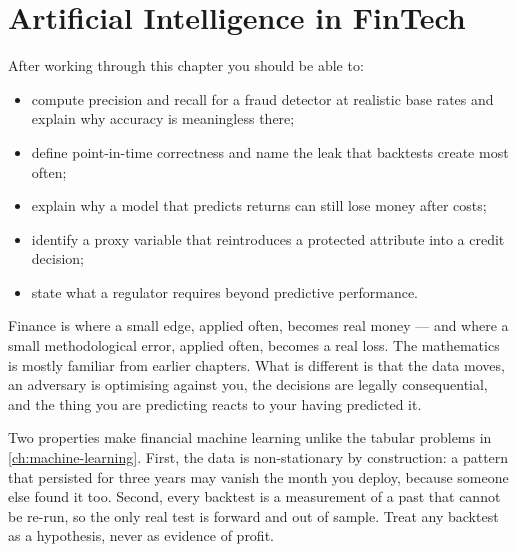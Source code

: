 
\chapter{Artificial Intelligence in FinTech}


\label{ch:fintech}

\begin{learningobjectives}
After working through this chapter you should be able to:
\begin{itemize}
  \item compute precision and recall for a fraud detector at realistic base
        rates and explain why accuracy is meaningless there;
  \item define point-in-time correctness and name the leak that backtests
        create most often;
  \item explain why a model that predicts returns can still lose money after
        costs;
  \item identify a proxy variable that reintroduces a protected attribute into
        a credit decision;
  \item state what a regulator requires beyond predictive performance.
\end{itemize}
\end{learningobjectives}

\begin{plainlanguage}
Finance is where a small edge, applied often, becomes real money --- and where
a small methodological error, applied often, becomes a real loss. The
mathematics is mostly familiar from earlier chapters. What is different is that
the data moves, an adversary is optimising against you, the decisions are
legally consequential, and the thing you are predicting reacts to your having
predicted it.
\end{plainlanguage}

\begin{engineernote}
Two properties make financial machine learning unlike the tabular problems in
\cref{ch:machine-learning}. First, the data is non-stationary by construction:
a pattern that persisted for three years may vanish the month you deploy,
because someone else found it too. Second, every backtest is a measurement of a
past that cannot be re-run, so the only real test is forward and out of sample.
Treat any backtest as a hypothesis, never as evidence of profit.
\end{engineernote}

